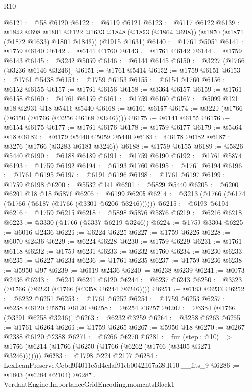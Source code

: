\begin{lexlean}{R10}
\begin{coremodule}
@6121 := @58 @6120
@6122 := @6119 @6121
@6123 := @6117 @6122
@6139 := @1842
    @698
    @1801
    @6122
    @1633
    @1848
    (@1853 (@1864 @698))
    (@1870 (@1871 (@1872 @1633) @1801 @1848))
    (@1915 @1631)
@6140 := @1761 @5057
@6141 := @1759 @6140
@6142 := @6141 @1760
@6143 := @1761 @6142
@6144 := @1759 @6143
@6145 := @3242 @5059
@6146 := @6144 @6145
@6150 := @3227 (@1766 (@3236 @6146 @3246))
@6151 := @1761 @5414
@6152 := @1759 @6151
@6153 := @1761 @5438
@6154 := @1759 @6153
@6155 := @6154 @1760
@6156 := @6152 @6155
@6157 := @1761 @6156
@6158 := @3364 @6157
@6159 := @1761 @6158
@6160 := @1761 @6159
@6161 := @1759 @6160
@6167 := @5099 @121 @18 @2931 @18 @5416 @5440
@6168 := @6161 @6167
@6174 := @3220 (@1766 (@6150 (@1766 (@3256 @6168 @3246))))
@6175 := @6141 @6155
@6176 := @6154 @6175
@6177 := @1761 @6176
@6178 := @1759 @6177
@6179 := @5464 @18
@6182 := @6179 @5440 @5059 @5440
@6183 := @6178 @6182
@6187 := @3276 (@1766 (@3283 @6183 @3246))
@6188 := @1759 @6155
@6189 := @5826 @5440
@6190 := @6188 @6189
@6191 := @1759 @6190
@6192 := @1761 @5874
@6193 := @1759 @6192
@6194 := @6193 @1760
@6195 := @1761 @6194
@6196 := @1761 @6195
@6197 := @6191 @6196
@6198 := @1761 @6197
@6199 := @1759 @6198
@6200 := @5532 @141
@6201 := @5829 @5440
@6205 := @6200 @6201 @18 @18 @5876
@6206 := @6199 @6205
@6214 := @3213 (@1766 (@6174 (@1766 (@6187 (@1766 (@3301 @6206 @3246))))))
@6215 := @6193 @6194
@6216 := @1759 @6215
@6218 := @5898 @5876 @5876
@6219 := @6216 @6218
@6223 := @3330 (@1766 (@3337 @6219 @3246))
@6224 := @1759 @3304
@6225 := @6016 @2436
@6226 := @6224 @6225
@6227 := @1759 @6226
@6228 := @6070 @2436
@6229 := @6224 @6228
@6230 := @1759 @6229
@6231 := @1761 @6118
@6232 := @1759 @6231
@6233 := @6232 @1760
@6234 := @6230 @6233
@6235 := @6227 @6234
@6236 := @1761 @6235
@6237 := @1759 @6236
@6238 := @5950 @97
@6239 := @6019 @2436
@6240 := @6238 @6239
@6241 := @6073 @2436
@6243 := @6240 @6241 @6120
@6244 := @6237 @6243
@6250 := @3323 (@1766 (@6223 (@1766 (@3358 @6244 @3246))))
@6251 := @6193 @6233
@6252 := @6232 @6251
@6253 := @1761 @6252
@6254 := @1759 @6253
@6257 := @6238 @6120 @5876 @6120
@6258 := @6254 @6257
@6262 := @3384 (@1766 (@3391 @6258 @3246))
@6263 := @6232 @3259
@6264 := @3258 @6263
@6265 := @1761 @6264
@6266 := @1759 @6265
@6267 := @5950 @18
@6270 := @6267 @2388 @6120 @2388
@6271 := @6266 @6270
@6281 := fun (step : @10) =>
  @1766 (@6214 (@1766 (@6250 (@1766 (@6262 (@1766 (@3405 @6271 @3246)))))))
@6283 := @1798 @224 @2107
@6284 := LexLeanPreserve.Cebd9f4011e5d4cdaf91cb0042ff67a38.R10.__fits_9
@6286 := @1803 (@6284 @2104)
@6287 := VerdantEngine.ImportanceGridEncoding.momentsBlock1

\end{coremodule}
\end{lexlean}
